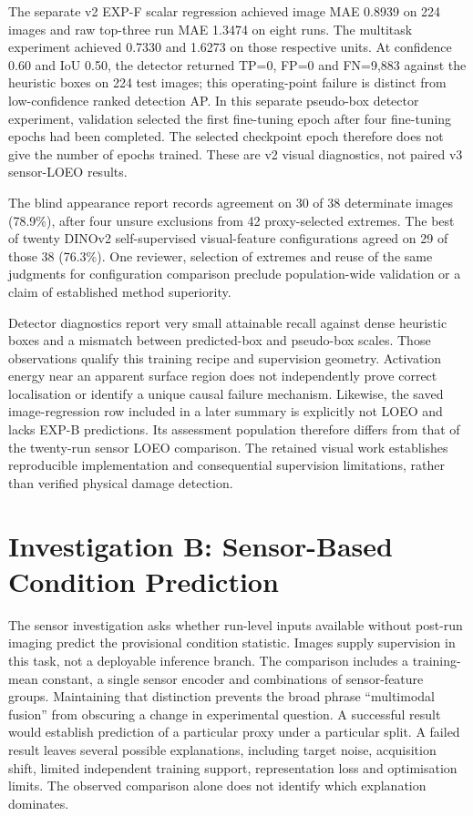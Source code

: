 The separate v2 EXP-F scalar regression achieved image MAE 0.8939 on 224 images
and raw top-three run MAE 1.3474 on eight runs. The multitask experiment achieved
0.7330 and 1.6273 on those respective units. At confidence 0.60 and IoU 0.50,
the detector returned TP=0, FP=0 and FN=9,883 against the heuristic boxes on 224 test
images; this operating-point failure is distinct from low-confidence ranked detection
AP. In this separate pseudo-box detector experiment, validation selected the first
fine-tuning epoch after four fine-tuning epochs had been completed. The selected
checkpoint epoch therefore does not give the number of epochs trained. These are v2
visual diagnostics, not paired v3 sensor-LOEO results.

The blind appearance report records agreement on 30 of 38 determinate images (78.9\%),
after four unsure exclusions from 42 proxy-selected extremes. The best of twenty
DINOv2 self-supervised visual-feature configurations agreed on 29 of those 38 (76.3\%). One reviewer, selection of
extremes and reuse of the same judgments for configuration comparison preclude
population-wide validation or a claim of established method superiority.

Detector diagnostics report very small attainable recall against dense heuristic boxes
and a mismatch between predicted-box and pseudo-box scales. Those observations qualify
this training recipe and supervision geometry. Activation energy near an apparent
surface region does not independently prove correct localisation or identify a unique
causal failure mechanism. Likewise, the saved image-regression row included in a later
summary is explicitly not LOEO and lacks EXP-B predictions. Its assessment population
therefore differs from that of the twenty-run sensor LOEO comparison. The retained
visual work establishes reproducible implementation and consequential supervision
limitations, rather than verified physical damage detection.

\section{Investigation B: Sensor-Based Condition Prediction}
The sensor investigation asks whether run-level inputs available without post-run
imaging predict the provisional condition statistic. Images supply supervision in this
task, not a deployable inference branch. The comparison includes a training-mean
constant, a single sensor encoder and combinations of sensor-feature groups. Maintaining
that distinction prevents the broad phrase ``multimodal fusion'' from obscuring a change
in experimental question. A successful result would establish prediction of a particular
proxy under a particular split. A failed result leaves several possible explanations,
including target noise, acquisition shift, limited independent training support,
representation loss and optimisation limits. The observed comparison alone does not
identify which explanation dominates.

